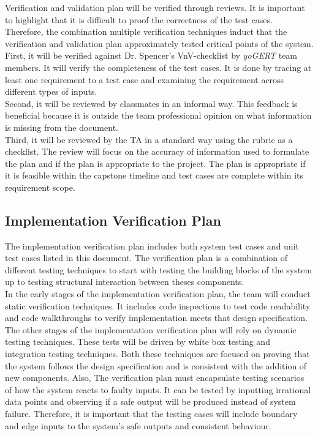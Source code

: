 \documentclass[12pt, titlepage]{article}
\begin{document}
Verification and validation plan will be verified through reviews. It is important to highlight that it is difficult to proof the correctness of the test cases. Therefore, the combination multiple verification techniques induct that the verification and validation plan  approximately tested critical points of the system.\\ 
First, it will be verified against Dr. Spencer's VnV-checklist by \emph{yoGERT} team members. It will verify the completeness of the test cases. It is done by tracing at least one requirement to a test case and examining the requirement across different types of inputs.\\ 
Second, it will be reviewed by classmates in an informal way. This feedback is beneficial because it is outside the team professional opinion on what information is missing from the document.\\ 
Third, it will be reviewed by the TA in a standard way using the rubric as a checklist. The review will focus on the accuracy of information used to formulate the plan and if the plan is appropriate to the project. The plan is appropriate if it is feasible within the capstone timeline and test cases are complete within its requirement scope. 




\subsection{Implementation Verification Plan}

The implementation verification plan includes both
system test cases and unit test cases listed in this 
document. The verification plan is a combination of 
different testing techniques to start with testing the 
building blocks of the system up to testing structural 
interaction between theses components.\\ 
In the early stages of the implementation verification 
plan, the team will conduct static verification
techniques. It includes code inspections to test code 
readability and code walkthroughs to verify 
implementation meets that design specification. \\
The other stages of the implementation verification plan will rely on dynamic 
testing techniques. These tests will be driven by white box testing and 
integration testing techniques. Both these techniques are focused on proving that 
the system follows the design specification and is consistent with the addition of
new components. Also, The verification plan must encapsulate testing scenarios of how the system reacts to faulty inputs. It can be tested by inputting irrational data points and observing if a safe output will be produced instead of system failure. Therefore, it is important that the testing cases will include boundary and edge inputs to the system's safe outputs and consistent behaviour.
\end{document}
